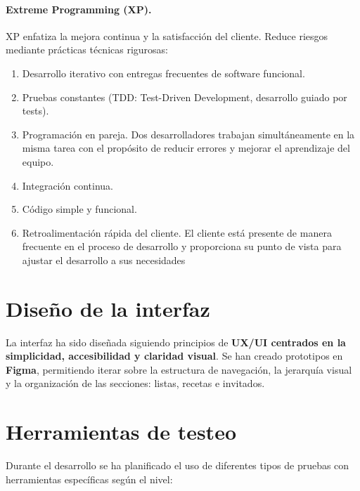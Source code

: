 \paragraph{Extreme Programming (XP).} XP enfatiza la mejora continua y la satisfacción del cliente. Reduce riesgos mediante prácticas técnicas rigurosas:

\begin{enumerate}
    \item Desarrollo iterativo con entregas frecuentes de software funcional.
    \item Pruebas constantes (TDD: Test-Driven Development, desarrollo guiado por tests).
    \item Programación en pareja. Dos desarrolladores trabajan simultáneamente en la misma tarea con el propósito de reducir errores y mejorar el aprendizaje del equipo.
    \item Integración continua.
    \item Código simple y funcional.
    \item Retroalimentación rápida del cliente. El cliente está presente de manera frecuente en el proceso de desarrollo y proporciona su punto de vista para ajustar el desarrollo a sus necesidades
\end{enumerate}

\section{Diseño de la interfaz}

La interfaz ha sido diseñada siguiendo principios de \textbf{UX/UI centrados en la simplicidad, accesibilidad y claridad visual}. Se han creado prototipos en \textbf{Figma}, permitiendo iterar sobre la estructura de navegación, la jerarquía visual y la organización de las secciones: listas, recetas e invitados.

\section{Herramientas de testeo}

Durante el desarrollo se ha planificado el uso de diferentes tipos de pruebas con herramientas específicas según el nivel:

